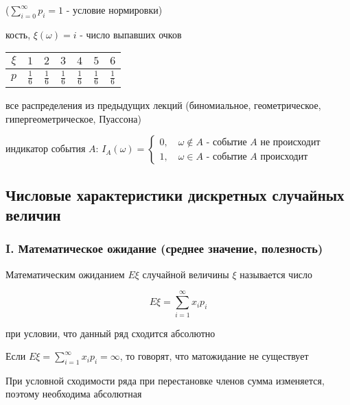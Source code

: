 \documentclass[12pt]{article}
\begin{document}
    ($\sum_{i = 0}^\infty p_i = 1$ - условие нормировки)

     кость, $\xi(\omega) = i$ - число выпавших очков

    \smallvspace


    \begin{tabular}{c|c|c|c|c|c|c}
        $\xi$ & $1$           & $2$           & $3$           & $4$           & $5$           & $6$           \\
        \hline
        $p$   & $\frac{1}{6}$ & $\frac{1}{6}$ & $\frac{1}{6}$ & $\frac{1}{6}$ & $\frac{1}{6}$ & $\frac{1}{6}$
    \end{tabular}


    \smallvspace

     все распределения из предыдущих лекций (биномиальное, геометрическое, гипергеометрическое, Пуассона)

     индикатор события $A$: $I_A (\omega) = \begin{cases}
                                                        0, \quad \omega \notin A \text{ - событие } A \text{ не происходит} \\ 1, \quad \omega \in A \text{ - событие } A \text{ происходит}
    \end{cases}$

    \hypertarget{attributesofdiscreterandomvalue}{}

    \subsection{Числовые характеристики дискретных случайных величин}

    \subsubsection{I. Математическое ожидание (среднее значение, полезность)}

    \Defs Математическим ожиданием $E\xi$ случайной величины $\xi$ называется число

    \[ E\xi = \sum_{i = 1}^\infty x_i p_i \]

    при условии, что данный ряд сходится абсолютно

    \Nota Если $E\xi = \sum_{i = 1}^\infty x_i p_i = \infty$, то говорят, что матожидание не существует

    При условной сходимости ряда при перестановке членов сумма изменяется, поэтому необходима абсолютная
\end{document}
